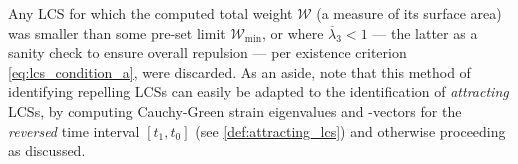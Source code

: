 Any LCS for which the computed total weight $\mathcal{W}$ (a measure of
its surface area) was smaller than some pre-set limit $\mathcal{W}_{\min}$, or
where $\overline{\lambda}_{3} < 1$ --- the latter as a sanity
check to ensure overall repulsion --- per existence criterion
\eqref{eq:lcs_condition_a}, were discarded. As an aside, note that this method
of identifying repelling LCSs can easily be adapted to the identification of
\emph{attracting} LCSs, by computing Cauchy-Green strain eigenvalues and
-vectors for the \emph{reversed} time interval $[t_{1},t_{0}]$ (see
\cref{def:attracting_lcs}) and otherwise proceeding as discussed.



